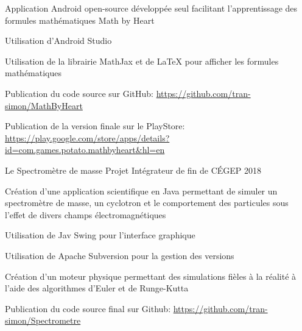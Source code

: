 \begin{cventries}
    \cventry
        {Application Android open-source développée seul facilitant l'apprentissage des formules mathématiques}
        {Math by Heart}
        {}
        {}
        {
       \begin{cvitems}
       \item{Utilisation d'Android Studio}
       \item{Utilisation de la librairie MathJax et de LaTeX pour afficher les formules mathématiques}
       \item{Publication du code source sur GitHub: \url{https://github.com/tran-simon/MathByHeart}}
       \item{Publication de la version finale sur le PlayStore: \url{https://play.google.com/store/apps/details?id=com.games.potato.mathbyheart&hl=en}}
       \end{cvitems}
        }
    \cventry
        {Le Spectromètre de masse}
        {Projet Intégrateur de fin de CÉGEP}
        {2018}
        {}
        {
            \begin{cvitems}
            \item{Création d'une application scientifique en Java permettant de simuler un spectromètre de masse, un cyclotron et le comportement des particules sous l'effet de divers champs électromagnétiques}
            \item{Utilisation de Jav Swing pour l'interface graphique}
            \item{Utilisation de Apache Subversion pour la gestion des versions}
            \item{Création d'un moteur physique permettant des simulations fièles à la réalité à l'aide des algorithmes d'Euler et de Runge-Kutta}
            \item{Publication du code source final sur Github: \url{https://github.com/tran-simon/Spectrometre}}
            \end{cvitems}
        }
\end{cventries}

